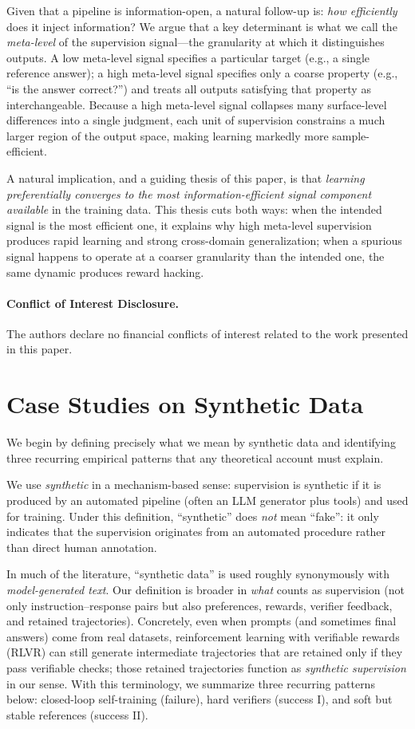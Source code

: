 \documentclass{article}
\theoremstyle{plain}
\theoremstyle{definition}
\theoremstyle{remark}
\begin{document}
Given that a pipeline is information-open, a natural follow-up is: \textit{how efficiently} does it inject information? We argue that a key determinant is what we call the \textit{meta-level} of the supervision signal---the granularity at which it distinguishes outputs. A low meta-level signal specifies a particular target (e.g., a single reference answer); a high meta-level signal specifies only a coarse property (e.g., ``is the answer correct?'') and treats all outputs satisfying that property as interchangeable. Because a high meta-level signal collapses many surface-level differences into a single judgment, each unit of supervision constrains a much larger region of the output space, making learning markedly more sample-efficient.

A natural implication, and a guiding thesis of this paper, is that \textit{learning preferentially converges to the most information-efficient signal component available} in the training data. This thesis cuts both ways: when the intended signal is the most efficient one, it explains why high meta-level supervision produces rapid learning and strong cross-domain generalization; when a spurious signal happens to operate at a coarser granularity than the intended one, the same dynamic produces reward hacking.

\paragraph{Conflict of Interest Disclosure.} The authors declare no financial conflicts of interest related to the work presented in this paper.

\section{Case Studies on Synthetic Data}

We begin by defining precisely what we mean by synthetic data and identifying three recurring empirical patterns that any theoretical account must explain.

We use \textit{synthetic} in a mechanism-based sense: supervision is synthetic if it is produced by an automated pipeline (often an LLM generator plus tools) and used for training. Under this definition, ``synthetic'' does \textit{not} mean ``fake'': it only indicates that the supervision originates from an automated procedure rather than direct human annotation.

In much of the literature, ``synthetic data'' is used roughly synonymously with \textit{model-generated text}. Our definition is broader in \textit{what} counts as supervision (not only instruction--response pairs but also preferences, rewards, verifier feedback, and retained trajectories). Concretely, even when prompts (and sometimes final answers) come from real datasets, reinforcement learning with verifiable rewards (RLVR) can still generate intermediate trajectories that are retained only if they pass verifiable checks; those retained trajectories function as \textit{synthetic supervision} in our sense. With this terminology, we summarize three recurring patterns below: closed-loop self-training (failure), hard verifiers (success I), and soft but stable references (success II).
\end{document}
